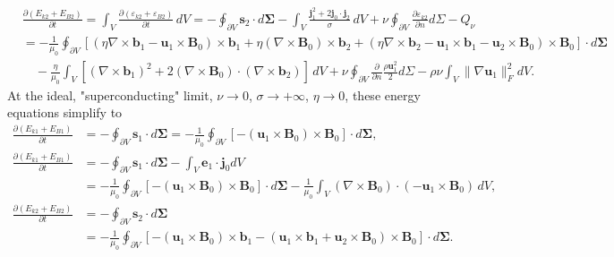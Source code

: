 \begin{equation}
    \begin{aligned}
        &\frac{\partial (E_{k2} + E_{B2})}{\partial t} = \int_V \frac{\partial (\varepsilon_{k2} + \varepsilon_{B2})}{\partial t} \, dV = - \oint_{\partial V} \mathbf{s}_2\cdot d\boldsymbol{\Sigma} - \int_V \frac{\mathbf{j}_1^2 + 2\mathbf{j}_0 \cdot \mathbf{j}_2}{\sigma}\, dV + \nu \oint_{\partial V} \frac{\partial \varepsilon_{k2}}{\partial n} d\Sigma - Q_\nu \\ 
        &= - \frac{1}{\mu_0} \oint_{\partial V} \left[(\eta \nabla\times \mathbf{b}_1 - \mathbf{u}_1\times\mathbf{B}_0)\times \mathbf{b}_1 + \eta(\nabla\times \mathbf{B}_0) \times \mathbf{b}_2 + (\eta \nabla\times \mathbf{b}_2 - \mathbf{u}_1\times \mathbf{b}_1 - \mathbf{u}_2\times \mathbf{B}_0)\times \mathbf{B}_0\right]\cdot d\boldsymbol{\Sigma} \\
        &\quad - \frac{\eta}{\mu_0} \int_V \left[(\nabla\times \mathbf{b}_1)^2 + 2(\nabla\times \mathbf{B}_0)\cdot (\nabla\times \mathbf{b}_2)\right] \, dV  + \nu \oint_{\partial V} \frac{\partial}{\partial n}\frac{\rho \mathbf{u}_1^2}{2} d\Sigma - \rho \nu \int_V \|\nabla\mathbf{u}_1\|_F^2 dV .
    \end{aligned}
\end{equation}
%
At the ideal, "superconducting" limit, $\nu \rightarrow 0$, $\sigma \rightarrow +\infty$, $\eta \rightarrow 0$, these energy equations simplify to 
%
\begin{equation}
\begin{aligned}
    \frac{\partial (E_{k1} + E_{B1})}{\partial t} &= -\oint_{\partial V} \mathbf{s}_1\cdot d\boldsymbol{\Sigma} = - \frac{1}{\mu_0} \oint_{\partial V} \left[- (\mathbf{u}_1\times\mathbf{B}_0)\times \mathbf{B}_0\right]\cdot d\boldsymbol{\Sigma}, \\
    \frac{\partial (E_{k1} + E_{B1})}{\partial t} &= -\oint_{\partial V} \mathbf{s}_1\cdot d\boldsymbol{\Sigma} - \int_V \mathbf{e}_1 \cdot \mathbf{j}_0 dV \\
    &= - \frac{1}{\mu_0} \oint_{\partial V} \left[- (\mathbf{u}_1\times\mathbf{B}_0)\times \mathbf{B}_0\right]\cdot d\boldsymbol{\Sigma} - \frac{1}{\mu_0}\int_V (\nabla\times \mathbf{B}_0)\cdot (-\mathbf{u}_1\times \mathbf{B}_0)\, dV, \\
    \frac{\partial (E_{k2} + E_{B2})}{\partial t} &= -\oint_{\partial V} \mathbf{s}_2\cdot d\boldsymbol{\Sigma} \\
    &= - \frac{1}{\mu_0} \oint_{\partial V} \left[- (\mathbf{u}_1\times\mathbf{B}_0)\times \mathbf{b}_1 - (\mathbf{u}_1\times \mathbf{b}_1 + \mathbf{u}_2\times \mathbf{B}_0)\times \mathbf{B}_0\right]\cdot d\boldsymbol{\Sigma}.
\end{aligned}
\end{equation}
